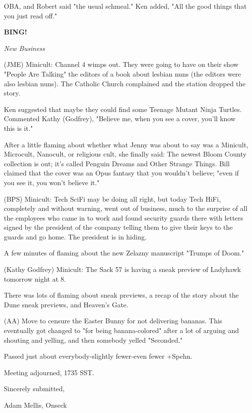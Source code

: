 \documentclass[12pt]{article}
\newcommand{\bing}{{\bf BING!} }
\newcommand{\goto}[1]{\bing \vskip 12pt \centerline{{\em{#1}}}}
\begin{document}
OBA, and Robert said "the usual schmeal." Ken added, "All the good things that you just read off."

\goto{New Business}

(JME) Minicult: Channel 4 wimps out. They were going to have on their show "People Are Talking" the editors of a book about lesbian nuns (the editors were also lesbian nuns). The Catholic Church complained and the station dropped the story.

Ken suggested that maybe they could find some Teenage Mutant Ninja Turtles. Commented Kathy (Godfrey), "Believe me, when you see a cover, you'll know this is it."

After a little flaming about whether what Jenny was about to say was a Minicult, Microcult, Nanocult, or religious cult, she finally said: The newest Bloom County collection is out; it's called Penguin Dreams and Other Strange Things. Bill claimed that the cover was an Opus fantasy that you wouldn't believe; "even if you see it, you won't believe it."

(BPS) Minicult: Tech SciFi may be doing all right, but today Tech HiFi, completely and without warning, went out of business, much to the surprise of all the employees who came in to work and found security guards there with letters signed by the president of the company telling them to give their keys to the guards and go home. The president is in hiding.

A few minutes of flaming about the new Zelazny manuscript "Trumps of Doom."

(Kathy Godfrey) Minicult: The Sack 57 is having a sneak preview of Ladyhawk tomorrow night at 8.

There was lots of flaming about sneak previews, a recap of the story about the Dune sneak previews, and Heaven's Gate.

(AA) Move to censure the Easter Bunny for not delivering bananas. This eventually got changed to "for being banana-colored" after a lot of arguing and shouting and yelling, and then somebody yelled "Seconded."

Passed just about everybody-slightly fewer-even fewer +Spehn.

\vspace{12pt}

\noindent
Meeting adjourned, 1735 SST.

\vspace{18pt}

\centerline{Sincerely submitted,}
\centerline{Adam Mellis, Onseck}
\end{document}
